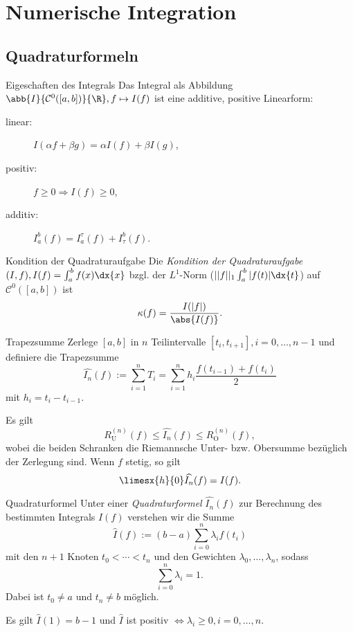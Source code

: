 \section{Numerische Integration}

\subsection*{Quadraturformeln}

\begin{karte}{Eigeschaften des Integrals}
    Das Integral als Abbildung \( \abb{I}{\mathcal{C}^0([a,b])}{\R}, f \mapsto I(f) \) ist 
    eine additive, positive Linearform:
    
    \begin{description}
        \item[linear:] \( I(\alpha f + \beta g) = \alpha I(f) + \beta I(g) \),
        \item[positiv:] \( f\geq 0 \Rightarrow I(f) \geq 0\),
        \item[additiv:] \( I_a^b(f) = I_a^\tau(f) + I_\tau^b(f) \).
    \end{description}
\end{karte}

\begin{karte}{Kondition der Quadraturaufgabe}
    Die \textit{Kondition der Quadraturaufgabe} \( (I,f), I(f) = \int_a^b f(x) \dx{x} \) 
    bzgl. der \( L^1 \)-Norm (\( ||f||_1 \int_a^b |f(t) | \dx{t} \)) auf \( \mathcal{C}^0([a,b]) \) 
    ist 
    \[ \kappa(f) = \frac{I(|f|)}{\abs{I(f)}}. \]
\end{karte}

\begin{karte}{Trapezsumme}
    Zerlege \( [a,b] \) in \( n \) Teilintervalle \( [t_i, t_{i+1}], i = 0, \ldots, n-1 \) 
    und definiere die Trapezsumme
    \[ \widehat{I_n}(f) := \sum_{i=1}^n T_i = \sum_{i=1}^n h_i \frac{f(t_{i-1}) + f(t_i)}{2} \]
    mit \( h_i = t_i - t_{i-1} \).
    
    Es gilt 
    \[ R_\mathrm{U}^{(n)}(f) \leq \widehat{I_n}(f) \leq R_{\mathrm{O}}^{(n)}(f), \]
    wobei die beiden Schranken die Riemannsche Unter- bzw. Obersumme bezüglich der Zerlegung sind.
    Wenn \(f\) stetig, so gilt 
    \[ \limesx{h}{0} \widehat{I_n}(f) = I(f). \]
\end{karte}

\begin{karte}{Quadraturformel}
    Unter einer \textit{Quadraturformel} \( \widehat{I_n}(f) \) zur Berechnung des 
    bestimmten Integrals \( I(f) \) verstehen wir die Summe 
    \[ \widehat{I}(f) := (b-a) \sum_{i=0}^n \lambda_i f(t_i) \]
    mit den \( n+1 \) Knoten \( t_0 < \cdots < t_n \) und den Gewichten \( \lambda_0,\ldots, \lambda_n \), 
    sodass 
    \[ \sum_{i=0}^n \lambda_i = 1. \]
    Dabei ist \( t_0 \neq a \) und \( t_n \neq b \) möglich.

    Es gilt \( \widehat{I}(1) = b-1 \) und \( \widehat{I} \) ist positiv \( \Leftrightarrow \lambda_i \geq 0, i = 0,\ldots, n \).
\end{karte}

